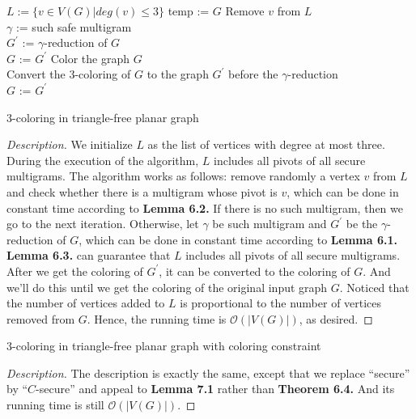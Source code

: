 \begin{algorithm}[H]
\DontPrintSemicolon
  $L := \{v \in V(G) | deg(v) \leq 3\}$  
  temp := $G$   
    { 
         Remove $v$ from $L$ \\
        {
            \Statex $\gamma$ := such safe multigram \\
            $G^{'}$ := $\gamma$-reduction of $G$ \\
            $G$ := $G^{'}$ 
        }
    }
   {
        Color the graph $G$ \\
   		Convert the 3-coloring of $G$ to the graph $G^{'}$ before the $\gamma$-reduction \\
   		$G$ := $G^{'}$
   }
\caption{3-coloring in triangle-free planar graph}
\end{algorithm}
\begin{proof}[Description] We initialize $L$ as the list of vertices with degree at most three. During the execution of the algorithm, $L$ includes all pivots of all secure multigrams. The algorithm works as follows: remove randomly a vertex $v$ from $L$ and check whether there is a multigram whose pivot is $v$, which can be done in constant time according to \textbf{Lemma 6.2.} If there is no such multigram, then we go to the next iteration. Otherwise, let $\gamma$ be such multigram and $G^{'}$ be the $\gamma$-reduction of $G$, which can be done in constant time according to \textbf{Lemma 6.1.} \textbf{Lemma 6.3.} can guarantee that $L$ includes all pivots of all secure multigrams. After we get the coloring of $G^{'}$, it can be converted to the coloring of $G$. And we'll do this until we get the coloring of the original input graph $G$. Noticed that the number of vertices added to $L$ is proportional to the number of vertices removed from $G$. Hence, the running time is $\mathcal{O}(|V(G)|)$, as desired.
\end{proof}

\begin{algorithm}[H]
\DontPrintSemicolon
\caption{3-coloring in triangle-free planar graph with coloring constraint}
\end{algorithm}
\begin{proof}[Description] 
The description is exactly the same, except that we replace
“secure” by “$C$-secure” and appeal to \textbf{Lemma 7.1} rather than \textbf{Theorem 6.4.} And its running time is still $\mathcal{O}(|V(G)|)$.\cite{dvorak2013threecoloring}
\end{proof}
